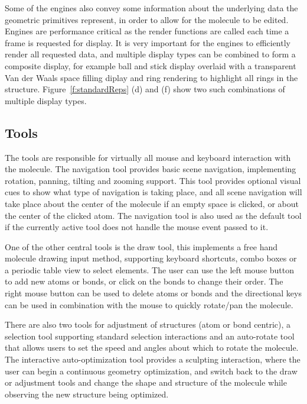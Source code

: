 \documentclass[10pt]{bmc_article}
\newenvironment{bmcformat}{\begin{raggedright}
\baselineskip20pt\sloppy\setboolean{publ}{false}}{\end{raggedright}
\baselineskip20pt\sloppy}
\begin{document}
\begin{bmcformat}
Some of the engines also convey some information about the underlying data the
geometric primitives represent, in order to allow for the molecule to be edited.
Engines are performance critical as the render functions are called each time a
frame is requested for display. It is very important for the engines to
efficiently render all requested data, and multiple display types can be
combined to form a composite display, for example ball and stick display
overlaid with a transparent Van der Waals space filling diplay and ring
rendering to highlight all rings in the structure. Figure~\ref{f:standardReps}
(d) and (f) show two such combinations of multiple display types.

\subsection{Tools}

The tools are responsible for virtually all mouse and keyboard interaction with
the molecule. The navigation tool provides basic scene navigation, implementing
rotation, panning, tilting and zooming support. This tool provides optional
visual cues to show what type of navigation is taking place, and all scene
navigation will take place about the center of the molecule if an empty space is
clicked, or about the center of the clicked atom. The navigation tool is also
used as the default tool if the currently active tool does not handle the mouse
event passed to it.

One of the other central tools is the draw tool, this implements a free hand
molecule drawing input method, supporting keyboard shortcuts, combo boxes or a
periodic table view to select elements. The user can use the left mouse button
to add new atoms or bonds, or click on the bonds to change their order. The
right mouse button can be used to delete atoms or bonds and the directional keys
can be used in combination with the mouse to quickly rotate/pan the molecule.

There are also two tools for adjustment of structures (atom or bond centric), a
selection tool supporting standard selection interactions and an auto-rotate
tool that allows users to set the speed and angles about which to rotate the
molecule. The interactive auto-optimization tool provides a sculpting
interaction, where the user can begin a continuous geometry optimization, and
switch back to the draw or adjustment tools and change the shape and structure
of the molecule while observing the new structure being optimized.


\end{bmcformat}
\end{document}
